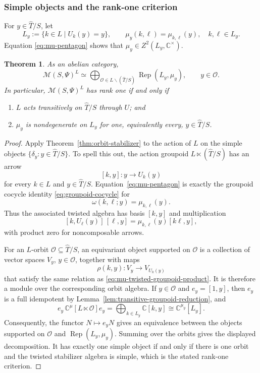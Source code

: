 \documentclass{amsart}
\newtheorem{theorem}{Theorem}[section]
\theoremstyle{definition}
\newcommand{\Rep}{\operatorname{Rep}}
\newcommand{\M}{\mathscr{M}}
\newcommand{\Ctimes}{\mathbb{C}^{\times}}
\numberwithin{equation}{section}
\begin{document}
\subsubsection{Simple objects and the rank-one criterion}
\label{sec:rank-one-criterion}

For $y\in \widehat{T}/S$, let
\[
 L_y:=\{k\in L\mid U_k(y)=y\},
 \qquad
 \mu_y(k,\ell)=\mu_{k,\ell}(y),\quad k,\ell\in L_y.
\]
Equation \eqref{eq:mu-pentagon} shows that $\mu_y\in Z^2(L_y,\Ctimes)$.

\begin{theorem}\label{thm:simple-equivariantized-module}
As an abelian category,
\[
 \M(S,\Psi)^{L}
 \simeq
 \bigoplus_{\mathcal O\in L\backslash (\widehat{T}/S)}
 \Rep(L_y,\mu_y),
 \qquad y\in\mathcal O.
\]
In particular, $\M(S,\Psi)^L$ has rank one if and only if
\begin{enumerate}
\item $L$ acts transitively on $\widehat{T}/S$ through $U$; and
\item $\mu_y$ is nondegenerate on $L_y$ for one, equivalently every, $y\in \widehat{T}/S$.
\end{enumerate}
\end{theorem}

\begin{proof}
Apply Theorem~\ref{thm:orbit-stabilizer} to the action of $L$ on the simple
objects $\{\delta_y:y\in \widehat{T}/S\}$.  To spell this out, the action groupoid
$L\ltimes (\widehat{T}/S)$ has an arrow
\[
 [k,y]:y\longrightarrow U_k(y)
\]
for every $k\in L$ and $y\in \widehat{T}/S$.  Equation~\eqref{eq:mu-pentagon} is exactly the
groupoid cocycle identity \eqref{eq:groupoid-cocycle} for
\[
 \omega(k,\ell;y)=\mu_{k,\ell}(y).
\]
Thus the associated twisted algebra has basis $[k,y]$ and multiplication
\begin{equation}\label{eq:mu-twisted-groupoid-product}
 [k,U_\ell(y)]\,[\ell,y]
 =\mu_{k,\ell}(y)[k\ell,y],
\end{equation}
with product zero for noncomposable arrows.

For an $L$-orbit $\mathcal O\subseteq \widehat{T}/S$, an equivariant object supported on
$\mathcal O$ is a collection of vector spaces $V_y$, $y\in\mathcal O$, together
with maps
\[
 \rho(k,y):V_y\longrightarrow V_{U_k(y)}
\]
that satisfy the same relation as
\eqref{eq:mu-twisted-groupoid-product}.  It is therefore a module over the
corresponding orbit algebra.  If $y\in\mathcal O$ and $e_y=[1,y]$, then $e_y$ is
a full idempotent by Lemma~\ref{lem:transitive-groupoid-reduction}, and
\[
 e_y\,\mathbb C^{\mu}[L\ltimes\mathcal O]e_y
 =\bigoplus_{k\in L_y}\mathbb C[k,y]
 \cong\mathbb C^{\mu_y}[L_y].
\]
Consequently, the functor $N\mapsto e_yN$ gives an equivalence between the
objects supported on $\mathcal O$ and $\Rep(L_y,\mu_y)$.  Summing over the
orbits gives the displayed decomposition.  It has exactly one simple object if
and only if there is one orbit and the twisted stabilizer algebra is simple,
which is the stated rank-one criterion.
\end{proof}
\end{document}
